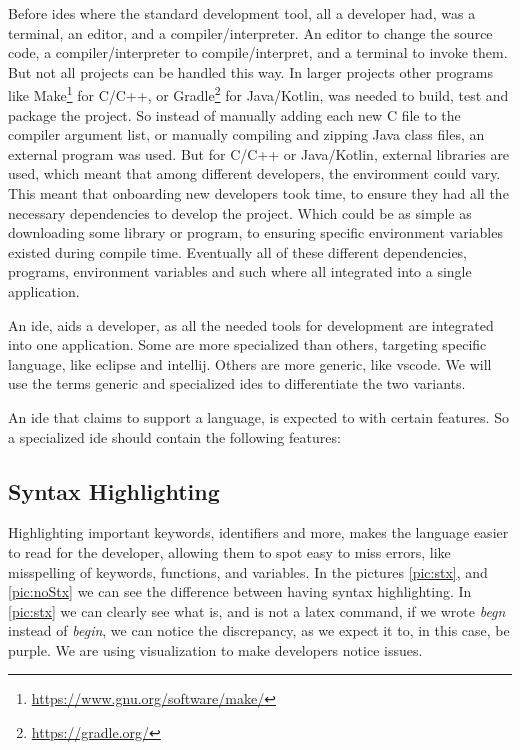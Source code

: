 Before \gls*{ide}s where the standard development tool, all a developer had, was
a terminal, an editor, and a compiler/interpreter. An editor to change the
source code, a compiler/interpreter to compile/interpret, and a terminal to
invoke them. But not all projects can be handled this way. In larger projects
other programs like
Make\footnote{\url{https://www.gnu.org/software/make/}} for C/C++, or
Gradle\footnote{\url{https://gradle.org/}} for Java/Kotlin, was needed to
build, test and package the project. So instead of manually adding each new C
file to the compiler argument list, or manually compiling and zipping Java class
files, an external program was used. But for C/C++ or Java/Kotlin, external
libraries are used, which meant that among different developers, the environment
could vary. This meant that onboarding new developers took time, to ensure they
had all the necessary dependencies to develop the project. Which could be as
simple as downloading some library or program, to ensuring specific environment
variables existed during compile time. Eventually all of these different
dependencies, programs, environment variables and such where all integrated into
a single application.

An \gls*{ide}, aids a developer, as all the needed tools for development are
integrated into one application. Some are more specialized than others,
targeting specific language, like \gls*{eclipse} and \gls*{intellij}. Others are
more generic, like \gls*{vscode}. We will use the terms generic and specialized
\gls*{ide}s to differentiate the two variants.

An \gls*{ide} that claims to support a language, is expected to with certain
features. So a specialized \gls*{ide} should contain the following features:

\subsection{Syntax Highlighting}

Highlighting important keywords, identifiers and more, makes the language easier
to read for the developer, allowing them to spot easy to miss errors, like
misspelling of keywords, functions, and variables. In the pictures
\ref{pic:stx}, and \ref{pic:noStx} we can see the difference between having
syntax highlighting. In \ref{pic:stx} we can clearly see what is, and is not a
latex command, if we wrote \textit{begn} instead of \textit{begin}, we can
notice the discrepancy, as we expect it to, in this case, be purple. We are
using visualization to make developers notice issues.

